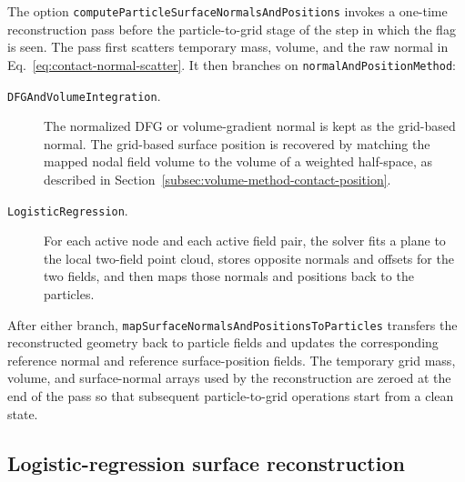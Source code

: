 The option \texttt{computeParticleSurfaceNormalsAndPositions} invokes a one-time reconstruction pass before the particle-to-grid stage of the step in which the flag is seen.  The pass first scatters temporary mass, volume, and the raw normal in Eq.~\eqref{eq:contact-normal-scatter}.  It then branches on \texttt{normalAndPositionMethod}:
\begin{description}
  \item[\texttt{DFGAndVolumeIntegration}.] The normalized DFG or volume-gradient normal is kept as the grid-based normal.  The grid-based surface position is recovered by matching the mapped nodal field volume to the volume of a weighted half-space, as described in Section~\ref{subsec:volume-method-contact-position}.
  \item[\texttt{LogisticRegression}.] For each active node and each active field pair, the solver fits a plane to the local two-field point cloud, stores opposite normals and offsets for the two fields, and then maps those normals and positions back to the particles.
\end{description}
After either branch, \texttt{mapSurfaceNormalsAndPositionsToParticles} transfers the reconstructed geometry back to particle fields and updates the corresponding reference normal and reference surface-position fields.  The temporary grid mass, volume, and surface-normal arrays used by the reconstruction are zeroed at the end of the pass so that subsequent particle-to-grid operations start from a clean state.

\subsection{Logistic-regression surface reconstruction}
\label{subsec:logistic-regression-contact-normal}

